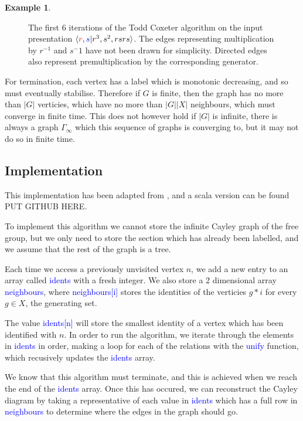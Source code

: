 \documentclass[10pt]{article}
\theoremstyle{plain}
\theoremstyle{definition}
\newtheorem{example}[theorem]{Example}
\theoremstyle{definition}
\theoremstyle{definition}
\begin{document}
\begin{multicols}{2}
\begin{example}
\begin{figure}[p]
		\caption{The first 6 iterations of the Todd Coxeter algorithm on the input presentation $\langle \textcolor{red}{r}, \textcolor{blue}s | r^3, s^2, rsrs \rangle$. The edges representing multiplication by $r^{-1}$ and $s^-{1}$ have not been drawn for simplicity. Directed edges also represent premultiplication by the corresponding generator.}
	\end{figure}

\end{example}

For termination, each vertex has a label which is monotonic decreasing, and so must eventually stabilise. Therefore if $G$ is finite, then the graph has no more than $|G|$ verticies, which have no more than $|G||X|$ neighbours, which must converge in finite time. This does not however hold if $|G|$ is infinite, there is always a graph $\Gamma_\infty$ which this sequence of graphs is converging to, but it may not do so in finite time. \cite{ToddCoxeter}

\subsection{Implementation}

This implementation has been adapted from \cite{ToddCoxeter}, and a scala version can be found PUT GITHUB HERE.

To implement this algorithm we cannot store the infinite Cayley graph of the free group, but we only need to store the section which has already been labelled, and we assume that the rest of the graph is a tree.

Each time we access a previously unvisited vertex $n$, we add a new entry to an array called \textcolor{blue}{idents} with a fresh integer. We also store a 2 dimensional array \textcolor{blue}{neighbours}, where \textcolor{blue}{neighbours[i]} stores the identities of the verticies $g * i$ for every $g \in X$, the generating set.

The value \textcolor{blue}{idents[n]} will store the smallest identity of a vertex which has been identified with $n$. In order to run the algorithm, we iterate through the elements in \textcolor{blue}{idents} in order, making a loop for each of the relations with the \textcolor{blue}{unify} function, which recusively updates the \textcolor{blue}{idents} array.

We know that this algorithm must terminate, and this is achieved when we reach the end of the \textcolor{blue}{idents} array. Once this has occured, we can reconstruct the Cayley diagram by taking a representative of each value in \textcolor{blue}{idents} which has a full row in \textcolor{blue}{neighbours} to determine where the edges in the graph should go.


\end{multicols}
\end{document}
